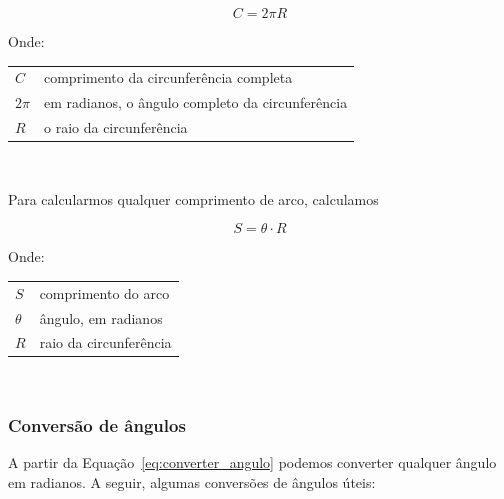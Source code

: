 \documentclass[12pt,openright,twoside,a4paper]{article}
\makeatletter
\theoremstyle{definition}
\newenvironment{condicoes}[1][Onde:]
{#1 \begin{tabular}[t]{>{$}l<{$} @{${} \implies {}$} l}}
	{\end{tabular}\\[\belowdisplayskip]}
\makeatother
\begin{document}
	\begin{equation*}
	\boxed{	C = 2 \pi R}
	\end{equation*}
	
	\begin{condicoes}
		C & comprimento da circunferência completa\\
		2 \pi & em radianos, o ângulo completo da circunferência\\
		R & o raio da circunferência
	\end{condicoes}
	
	Para calcularmos qualquer comprimento de arco, calculamos
	
	\begin{equation*}
		\boxed{S = \theta \cdot R}
	\end{equation*}
	
	\begin{condicoes}
		S & comprimento do arco\\
		\theta & ângulo, em radianos\\
		R & raio da circunferência
	\end{condicoes}

	\subsubsection{Conversão de ângulos}
	
	A partir da Equação~\ref{eq:converter_angulo} podemos converter qualquer ângulo em radianos. A seguir, algumas conversões de ângulos úteis:
	
\end{document}
